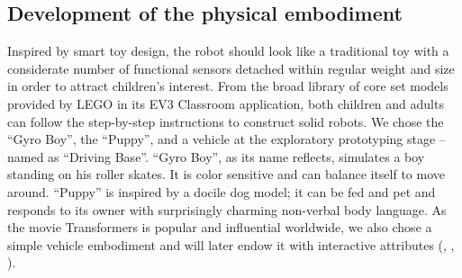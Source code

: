 \documentclass[english]{textolivre}
\begin{document}
\subsection{Development of the physical embodiment}\label{sec-modelo}
Inspired by \textcite{martin-ruiz_foundations_2015} smart toy design, the robot should look like a traditional toy with a considerate number of functional sensors detached within regular weight and size in order to attract children’s interest. From the broad library of core set models provided by LEGO in its EV3 Classroom application, both children and adults can follow the step-by-step instructions to construct solid robots. We chose the “Gyro Boy”, the “Puppy”, and a vehicle at the exploratory prototyping stage – named as “Driving Base”. “Gyro Boy”, as its name reflects, simulates a boy standing on his roller skates. It is color sensitive and can balance itself to move around. “Puppy” is inspired by a docile dog model; it can be fed and pet and responds to its owner with surprisingly charming non-verbal body language. As the movie Transformers is popular and influential worldwide, we also chose a simple vehicle embodiment and will later endow it with interactive attributes (, , ).
\end{document}
